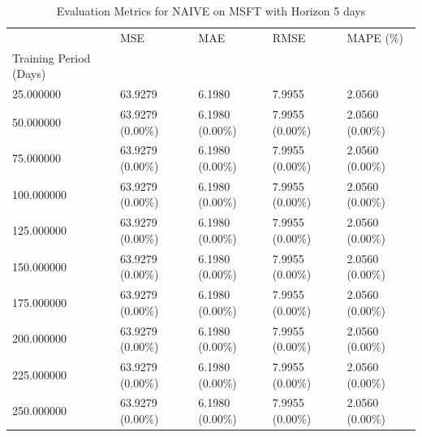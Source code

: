 \begin{table}
\caption{Evaluation Metrics for NAIVE on MSFT with Horizon 5 days}
\label{tab:naive_MSFT_h5_metrics}
\begin{tabular}{lllll}
\toprule
 & MSE & MAE & RMSE & MAPE (\%) \\
Training Period (Days) &  &  &  &  \\
\midrule
25.000000 & 63.9279 & 6.1980 & 7.9955 & 2.0560 \\
50.000000 & 63.9279 (0.00\%) & 6.1980 (0.00\%) & 7.9955 (0.00\%) & 2.0560 (0.00\%) \\
75.000000 & 63.9279 (0.00\%) & 6.1980 (0.00\%) & 7.9955 (0.00\%) & 2.0560 (0.00\%) \\
100.000000 & 63.9279 (0.00\%) & 6.1980 (0.00\%) & 7.9955 (0.00\%) & 2.0560 (0.00\%) \\
125.000000 & 63.9279 (0.00\%) & 6.1980 (0.00\%) & 7.9955 (0.00\%) & 2.0560 (0.00\%) \\
150.000000 & 63.9279 (0.00\%) & 6.1980 (0.00\%) & 7.9955 (0.00\%) & 2.0560 (0.00\%) \\
175.000000 & 63.9279 (0.00\%) & 6.1980 (0.00\%) & 7.9955 (0.00\%) & 2.0560 (0.00\%) \\
200.000000 & 63.9279 (0.00\%) & 6.1980 (0.00\%) & 7.9955 (0.00\%) & 2.0560 (0.00\%) \\
225.000000 & 63.9279 (0.00\%) & 6.1980 (0.00\%) & 7.9955 (0.00\%) & 2.0560 (0.00\%) \\
250.000000 & 63.9279 (0.00\%) & 6.1980 (0.00\%) & 7.9955 (0.00\%) & 2.0560 (0.00\%) \\
\bottomrule
\end{tabular}
\end{table}
